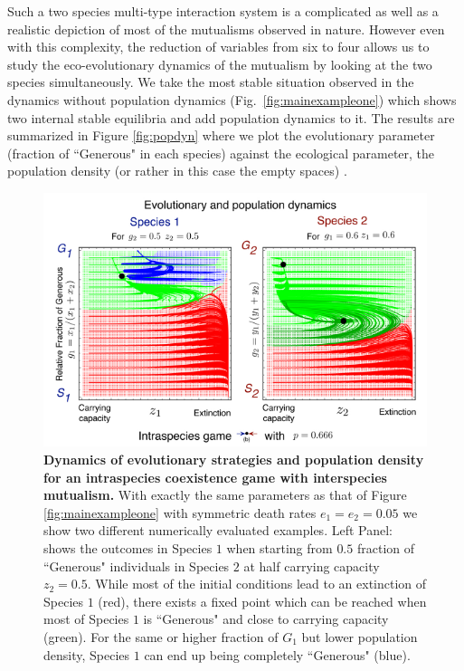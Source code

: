 \documentclass[12pt]{article}
\begin{document}
Such a two species multi-type interaction system is a complicated as well as a realistic depiction of most of the mutualisms observed in nature.
However even with this complexity, the reduction of variables from six to four allows us to study the eco-evolutionary dynamics of the mutualism by looking at the two species simultaneously.
We take the most stable situation observed in the dynamics without population dynamics (Fig.~\ref{fig:mainexampleone}) which shows two internal stable equilibria and add population dynamics to it.
The results are summarized in Figure \ref{fig:popdyn} where we plot the evolutionary parameter (fraction of ``Generous" in each species) against the ecological parameter, the population density (or rather in this case the empty spaces) .

\begin{figure}
\begin{center}
\includegraphics[width=\columnwidth]{../Figures/mainexamplepopdyn2.pdf}
\caption{\small{
\textbf{Dynamics of evolutionary strategies and population density for an intraspecies coexistence game with interspecies mutualism.}
With exactly the same parameters as that of Figure \ref{fig:mainexampleone} with  symmetric death rates $e_1 = e_2 = 0.05$ we show two different numerically evaluated examples.
Left Panel: shows the outcomes in Species $1$ when starting from $0.5$ fraction of ``Generous" individuals in Species $2$ at half carrying capacity $z_2 = 0.5$.
While most of the initial conditions lead to an extinction of Species $1$ (red), there exists a fixed point which can be reached when most of Species $1$ is ``Generous" and close to carrying capacity (green). For the same or higher fraction of $G_1$ but lower population density, Species $1$ can end up being completely ``Generous" (blue).
}}
\end{center}
\end{figure}
\end{document}
